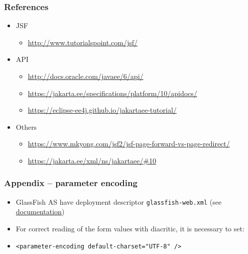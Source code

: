 \documentclass[10pt,xcolor=pdflatex]{beamer}
\begin{document}
\begin{frame}\frametitle{References}
	\begin{itemize}
		\item JSF
          \begin{itemize}
        	\item \url{http://www.tutorialspoint.com/jsf/}
          \end{itemize}
        \item API
          \begin{itemize}
            \item \url{http://docs.oracle.com/javaee/6/api/}
            \item \url{https://jakarta.ee/specifications/platform/10/apidocs/}
            \item \url{https://eclipse-ee4j.github.io/jakartaee-tutorial/}
          \end{itemize}
        \item Others
          \begin{itemize}
            \item \url{https://www.mkyong.com/jsf2/jsf-page-forward-vs-page-redirect/}
            \item \url{https://jakarta.ee/xml/ns/jakartaee/#10}
          \end{itemize}
	\end{itemize}
\end{frame}


\begin{frame}\frametitle{Appendix -- parameter encoding}
	\begin{itemize}
		\item GlassFish AS have deployment descriptor \texttt{glassfish-web.xml} (see \href{https://javaee.github.io/glassfish/doc/5.0/application-deployment-guide.pdf}{documentation})
        \item For correct reading of the form values with diacritic, it is necessary to set:
        \item[] \texttt{<parameter-encoding default-charset="UTF-8" />}
	\end{itemize}
\end{frame}

\end{document}
